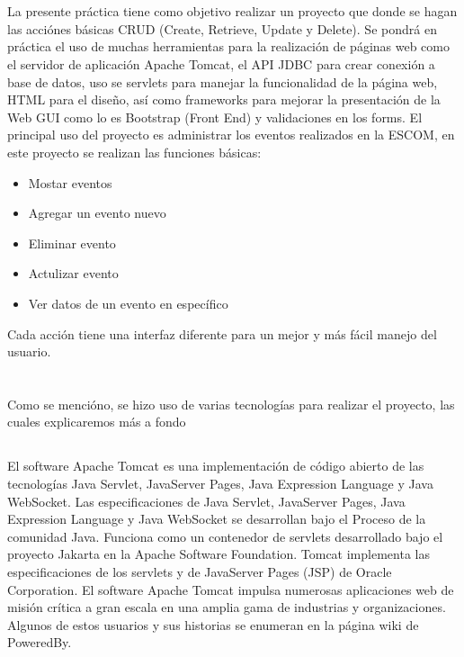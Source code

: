 \documentclass[10pt,a4paper]{article}
\begin{document}
\section{\color{colorIPN}{Introducción}}
La presente práctica tiene como objetivo realizar un proyecto que donde se hagan las acciónes básicas CRUD (Create, Retrieve, Update y Delete).
Se pondrá en práctica el uso de muchas herramientas para la realización de páginas web como el servidor de aplicación Apache Tomcat, el API JDBC para crear conexión a base de datos, uso se servlets para manejar la funcionalidad de la página web, HTML para el diseño, así como frameworks para mejorar la presentación de la Web GUI como lo es Bootstrap (Front End) y validaciones en los forms.
El principal uso del proyecto es administrar los eventos realizados en la ESCOM, en este proyecto se realizan las funciones básicas:
\begin{itemize}
    \item Mostar eventos
    \item Agregar un evento nuevo
    \item Eliminar evento
    \item Actulizar evento
    \item Ver datos de un evento en específico
\end{itemize}
Cada acción tiene una interfaz diferente para un mejor y más fácil manejo del usuario.
 
\pagebreak

\section{\color{colorIPN}{Conceptos}}
Como se mencióno, se hizo uso de varias tecnologías para realizar el proyecto, las cuales explicaremos más a fondo
\subsection{ \color{colorESCOM}{Apache Tomcat}}
El software Apache Tomcat es una implementación de código abierto de las tecnologías Java Servlet, JavaServer Pages, Java Expression Language y Java WebSocket. Las especificaciones de Java Servlet, JavaServer Pages, Java Expression Language y Java WebSocket se desarrollan bajo el Proceso de la comunidad Java.
Funciona como un contenedor de servlets desarrollado bajo el proyecto Jakarta en la Apache Software Foundation. Tomcat implementa las especificaciones de los servlets y de JavaServer Pages (JSP) de Oracle Corporation.
El software Apache Tomcat impulsa numerosas aplicaciones web de misión crítica a gran escala en una amplia gama de industrias y organizaciones. Algunos de estos usuarios y sus historias se enumeran en la página wiki de PoweredBy.
\end{document}
